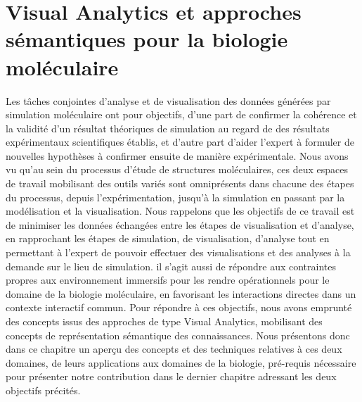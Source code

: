 
\chapter[Visual Analytics et approches sémantiques pour la biologie moléculaire]{Visual Analytics et approches sémantiques pour la biologie moléculaire}
\label{Sec:VisuAna_def}
\minitoc
\cleardoublepage



Les tâches conjointes d'analyse et de visualisation des données générées par simulation moléculaire ont pour objectifs, d'une part de confirmer la cohérence et la validité d'un résultat théoriques de simulation au regard de des résultats expérimentaux scientifiques établis, et d'autre part d'aider l'expert à formuler de nouvelles hypothèses à confirmer ensuite de manière expérimentale. Nous avons vu qu'au sein du processus d'étude de structures moléculaires, ces deux espaces de travail mobilisant des outils variés sont omniprésents dans chacune des étapes du processus, depuis l'expérimentation, jusqu'à la simulation en passant par la modélisation et la visualisation. Nous rappelons que les objectifs de ce travail est de minimiser les données échangées entre les étapes de visualisation et d'analyse, en rapprochant les étapes de simulation, de visualisation, d'analyse tout en permettant à l'expert de pouvoir effectuer des visualisations et des analyses à la demande sur le lieu de simulation. il s'agit aussi de répondre aux contraintes propres aux environnement immersifs pour les rendre opérationnels pour le domaine de la biologie moléculaire, en favorisant les interactions directes dans un  contexte interactif commun. Pour répondre à ces objectifs, nous avons emprunté des concepts issus des approches de type Visual Analytics, mobilisant des concepts de représentation sémantique des connaissances. Nous présentons donc dans ce chapitre un aperçu des concepts et des techniques relatives à ces deux domaines, de leurs applications aux domaines de la biologie, pré-requis nécessaire pour présenter notre contribution dans le dernier chapitre adressant les deux objectifs précités. 



